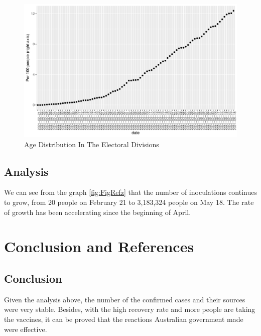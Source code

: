 \documentclass[11pt,a4paper,]{article}
\begin{document}
\begin{figure}

{\centering \includegraphics{report_files/figure-latex/unnamed-chunk-14-1} 

}

\caption{Age Distribution In The Electoral Divisions}\label{fig:unnamed-chunk-14}
\end{figure}

\hypertarget{analysis-7}{%
\subsection{Analysis}\label{analysis-7}}

We can see from the graph \ref{fig:FigRefz} that the number of inoculations continues to grow, from 20 people on February 21 to 3,183,324 people on May 18. The rate of growth has been accelerating since the beginning of April.

\hypertarget{conclusion-and-references}{%
\section{Conclusion and References}\label{conclusion-and-references}}

\hypertarget{conclusion}{%
\subsection{Conclusion}\label{conclusion}}

Given the analysis above, the number of the confirmed cases and their sources were very stable. Besides, with the high recovery rate and more people are taking the vaccines, it can be proved that the reactions Australian government made were effective.
\end{document}
